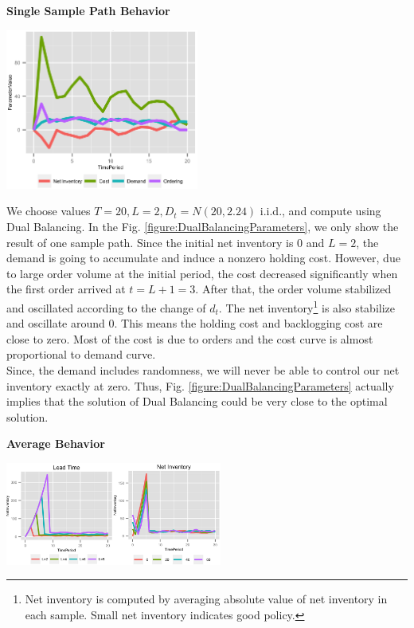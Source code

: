 \documentclass[twoside]{article}
\begin{document}
\begin{multicols}{2}
\begin{center}
  \textbf{Single Sample Path Behavior}
\end{center}
\begin{center}
  \label{figure:DualBalancingParameters}
  \includegraphics[width=2.5in]{figures/DualBalancingParameters.png}
\end{center}

We choose values $T=20,L=2,D_t=N(20,2.24)$ i.i.d., and compute using Dual Balancing. In the Fig. \ref{figure:DualBalancingParameters}, we only show the result of one sample path. Since the initial net inventory is $0$ and $L=2$, the demand is going to accumulate and induce a nonzero holding cost. However, due to large order volume at the initial period, the cost decreased significantly when the first order arrived at $t=L+1=3$. After that, the order volume stabilized and oscillated according to the change of $d_t$. The net inventory\footnote{Net inventory is computed by averaging absolute value of net inventory in each sample. Small net inventory indicates good policy.} is also stabilize and oscillate around $0$. This means the holding cost and backlogging cost are close to zero. Most of the cost is due to orders and the cost curve is almost proportional to demand curve.\\
Since, the demand includes randomness, we will never be able to control our net inventory exactly at zero. Thus, Fig. \ref{figure:DualBalancingParameters} actually implies that the solution of Dual Balancing could be very close to the optimal solution.
\begin{center}
  \textbf{Average Behavior}
\end{center}

\begin{center}
  \label{figure:NetInventoryLeadTime}
  \includegraphics[width=2.8in]{figures/NetInventoryLeadTime.png}
\end{center}


\end{multicols}
\end{document}
